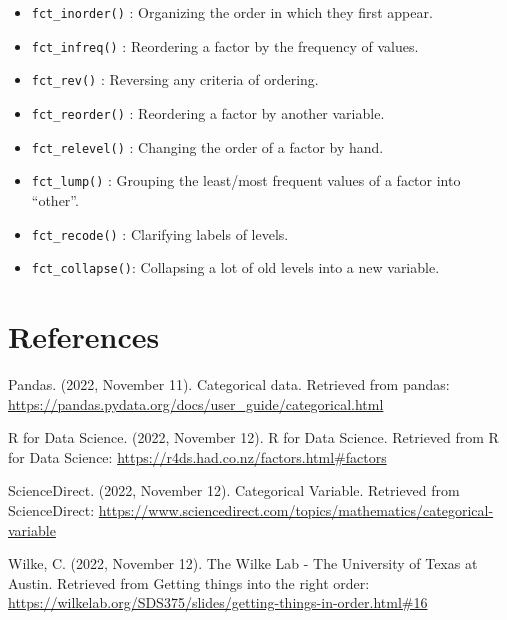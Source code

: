 \documentclass[
]{article}
\providecommand{\tightlist}{%
  \setlength{\itemsep}{0pt}\setlength{\parskip}{0pt}}
\begin{document}
\begin{itemize}
\tightlist
\item
  \texttt{fct\_inorder()} : Organizing the order in which they first
  appear.
\item
  \texttt{fct\_infreq()} : Reordering a factor by the frequency of
  values.
\item
  \texttt{fct\_rev()} : Reversing any criteria of ordering.
\item
  \texttt{fct\_reorder()} : Reordering a factor by another variable.
\item
  \texttt{fct\_relevel()} : Changing the order of a factor by hand.
\item
  \texttt{fct\_lump()} : Grouping the least/most frequent values of a
  factor into ``other''.
\item
  \texttt{fct\_recode()} : Clarifying labels of levels.
\item
  \texttt{fct\_collapse()}: Collapsing a lot of old levels into a new
  variable.
\end{itemize}

\hypertarget{references}{%
\section{References}\label{references}}

Pandas. (2022, November 11). Categorical data. Retrieved from pandas:
\url{https://pandas.pydata.org/docs/user_guide/categorical.html}

R for Data Science. (2022, November 12). R for Data Science. Retrieved
from R for Data Science:
\url{https://r4ds.had.co.nz/factors.html\#factors}

ScienceDirect. (2022, November 12). Categorical Variable. Retrieved from
ScienceDirect:
\url{https://www.sciencedirect.com/topics/mathematics/categorical-variable}

Wilke, C. (2022, November 12). The Wilke Lab - The University of Texas
at Austin. Retrieved from Getting things into the right order:
\url{https://wilkelab.org/SDS375/slides/getting-things-in-order.html\#16}
\end{document}
